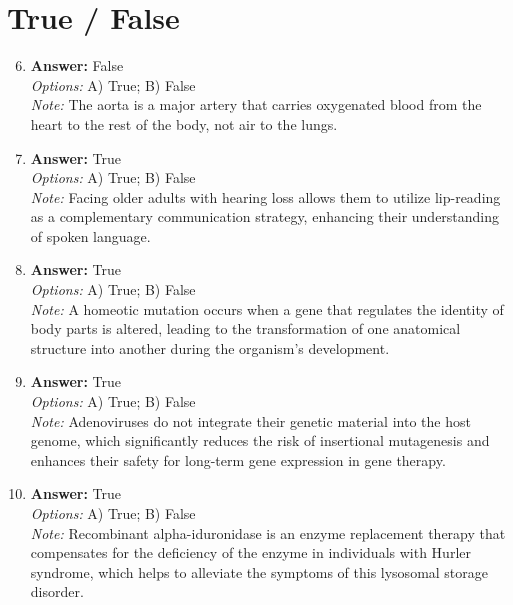 \documentclass[12pt]{article}
\begin{document}
\section*{True / False}
\begin{enumerate}[label=\arabic*.]
\setcounter{enumi}{5}
\item \textbf{Answer:} False
\\ \textit{Options:} A) True; B) False
\\ \textit{Note:} The aorta is a major artery that carries oxygenated blood from the heart to the rest of the body, not air to the lungs.
\item \textbf{Answer:} True
\\ \textit{Options:} A) True; B) False
\\ \textit{Note:} Facing older adults with hearing loss allows them to utilize lip-reading as a complementary communication strategy, enhancing their understanding of spoken language.
\item \textbf{Answer:} True
\\ \textit{Options:} A) True; B) False
\\ \textit{Note:} A homeotic mutation occurs when a gene that regulates the identity of body parts is altered, leading to the transformation of one anatomical structure into another during the organism's development.
\item \textbf{Answer:} True
\\ \textit{Options:} A) True; B) False
\\ \textit{Note:} Adenoviruses do not integrate their genetic material into the host genome, which significantly reduces the risk of insertional mutagenesis and enhances their safety for long-term gene expression in gene therapy.
\item \textbf{Answer:} True
\\ \textit{Options:} A) True; B) False
\\ \textit{Note:} Recombinant alpha-iduronidase is an enzyme replacement therapy that compensates for the deficiency of the enzyme in individuals with Hurler syndrome, which helps to alleviate the symptoms of this lysosomal storage disorder.
\end{enumerate}
\end{document}
